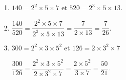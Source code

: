     \begin{enumerate}
        \item $140=2^2\times 5\times 7$ et $520=2^3\times 5\times 13$.
        \item $\dfrac{140}{520}=\dfrac{2^2\times 5\times 7}{2^3\times 5\times 13}=\dfrac{7}{2\times 13}=\dfrac{7}{26}$.
        \item $300=2^2\times 3\times 5^2$ et $126=2\times 3^2\times 7$

        $\dfrac{300}{126}=\dfrac{2^2\times 3\times 5^2}{2\times 3^2\times 7}=\dfrac{2\times 5^2}{3\times 7}=\dfrac{50}{21}$.
    \end{enumerate}
